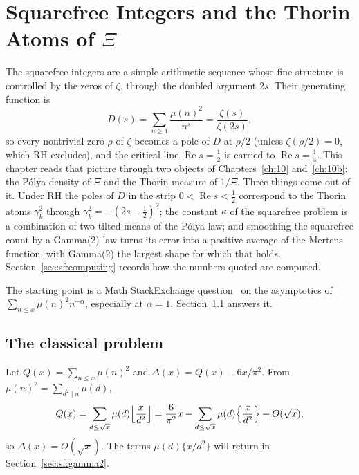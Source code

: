 \chapter[Squarefree Integers and Thorin Atoms]{Squarefree Integers and the Thorin Atoms of $\Xi$}\label{ch:squarefree}

The squarefree integers are a simple arithmetic sequence whose fine structure is controlled by the zeros of $\zeta$, through the doubled argument $2s$. Their generating function is
\[
D(s)=\sum_{n\ge1}\frac{\mu(n)^2}{n^s}=\frac{\zeta(s)}{\zeta(2s)},
\]
so every nontrivial zero $\rho$ of $\zeta$ becomes a pole of $D$ at $\rho/2$ (unless $\zeta(\rho/2)=0$, which RH excludes), and the critical line $\operatorname{Re} s=\frac12$ is carried to $\operatorname{Re} s=\frac14$. This chapter reads that picture through two objects of Chapters~\ref{ch:10} and~\ref{ch:10b}: the P\'olya density of $\Xi$ and the Thorin measure of $1/\Xi$. Three things come out of it. Under RH the poles of $D$ in the strip $0<\operatorname{Re}s<\frac12$ correspond to the Thorin atoms $\gamma_k^2$ through $\gamma_k^2=-(2s-\frac12)^2$; the constant $\kappa$ of the squarefree problem is a combination of two tilted means of the P\'olya law; and smoothing the squarefree count by a Gamma(2) law turns its error into a positive average of the Mertens function, with Gamma(2) the largest shape for which that holds. Section~\ref{sec:sf:computing} records how the numbers quoted are computed.

The starting point is a Math StackExchange question~\cite{mathstackexchange2016} on the asymptotics of $\sum_{n\le x}\mu(n)^2n^{-\alpha}$, especially at $\alpha=1$. Section~\ref{sec:sf:classical} answers it.

\section{The classical problem}\label{sec:sf:classical}

Let $Q(x)=\sum_{n\le x}\mu(n)^2$ and $\Delta(x)=Q(x)-6x/\pi^2$. From $\mu(n)^2=\sum_{d^2\mid n}\mu(d)$,
\begin{equation}\label{eq:sf:Qd}
Q(x)=\sum_{d\le\sqrt x}\mu(d)\Bigl\lfloor\frac{x}{d^2}\Bigr\rfloor=\frac{6}{\pi^2}x-\sum_{d\le\sqrt x}\mu(d)\Bigl\{\frac{x}{d^2}\Bigr\}+O(\sqrt x),
\end{equation}
so $\Delta(x)=O(\sqrt x)$. The terms $\mu(d)\{x/d^2\}$ will return in Section~\ref{sec:sf:gamma2}.

